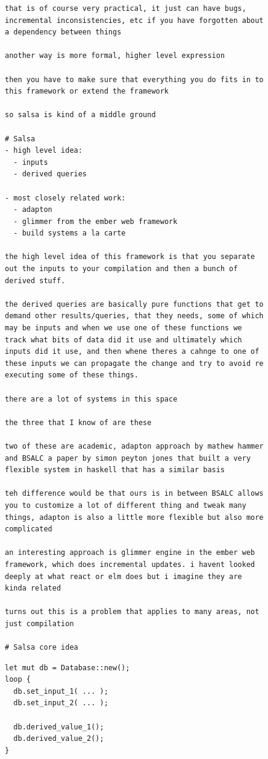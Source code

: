 \documentclass[12pt, a4paper]{report}
\begin{document}
\begin{Verbatim}[fontsize=\small]
that is of course very practical, it just can have bugs,
incremental inconsistencies, etc if you have forgotten about
a dependency between things

another way is more formal, higher level expression

then you have to make sure that everything you do fits in to
this framework or extend the framework

so salsa is kind of a middle ground

# Salsa
- high level idea:
  - inputs
  - derived queries

- most closely related work:
  - adapton
  - glimmer from the ember web framework
  - build systems a la carte

the high level idea of this framework is that you separate
out the inputs to your compilation and then a bunch of
derived stuff.

the derived queries are basically pure functions that get to
demand other results/queries, that they needs, some of which
may be inputs and when we use one of these functions we
track what bits of data did it use and ultimately which
inputs did it use, and then whene theres a cahnge to one of
these inputs we can propagate the change and try to avoid re
executing some of these things.

there are a lot of systems in this space

the three that I know of are these

two of these are academic, adapton approach by mathew hammer
and BSALC a paper by simon peyton jones that built a very
flexible system in haskell that has a similar basis

teh difference would be that ours is in between BSALC allows
you to customize a lot of different thing and tweak many
things, adapton is also a little more flexible but also more
complicated

an interesting approach is glimmer engine in the ember web
framework, which does incremental updates. i havent looked
deeply at what react or elm does but i imagine they are
kinda related

turns out this is a problem that applies to many areas, not
just compilation

# Salsa core idea
\end{Verbatim}

\begin{verbatim}
let mut db = Database::new();
loop {
  db.set_input_1( ... );
  db.set_input_2( ... );

  db.derived_value_1();
  db.derived_value_2();
}
\end{verbatim}
\end{document}
